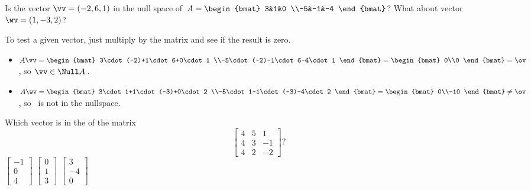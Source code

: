 \begin{example} 
Is the vector \(\vv=(-2,6,1)\) in the null space of~\(A=\begin{bmat} 3&1&0
\\-5&-1&-4 \end{bmat}\)?  
What about vector \(\wv=(1,-3,2)\)?
\begin{solution} 
To test a given vector, just multiply by the matrix and see if the result is zero.
\begin{itemize}
\item \(A\vv=\begin{bmat} 3\cdot(-2)+1\cdot6+0\cdot1
\\-5\cdot(-2)-1\cdot6-4\cdot1 \end{bmat}
=\begin{bmat} 0\\0 \end{bmat}=\ov\), so \(\vv\in\Null A\)\,.
\item \(A\wv=\begin{bmat} 3\cdot1+1\cdot(-3)+0\cdot2
\\-5\cdot1-1\cdot(-3)-4\cdot2 \end{bmat}
=\begin{bmat} 0\\-10 \end{bmat}\neq\ov\), so \wv~is not in the nullspace.
\end{itemize}
\end{solution}
\end{example}



\begin{activity}
Which vector is in the  of the matrix
\begin{equation*}
\begin{bmatrix} 4&5&1
\\4&3&-1
\\4&2&-2 \end{bmatrix}?
\end{equation*}
{\(\begin{bmatrix} -1\\0\\4 \end{bmatrix}\)}
{\(\begin{bmatrix} 0\\1\\3 \end{bmatrix}\)}
{\(\begin{bmatrix} 3\\-4\\0 \end{bmatrix}\)}
\end{activity}
   


